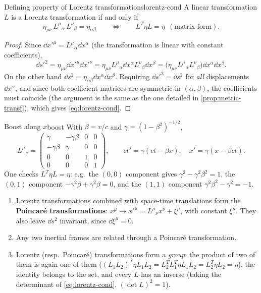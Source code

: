 \begin{proposition}{Defining property of Lorentz transformations}{lorentz-cond}
A linear transformation $L$ is a Lorentz transformation if and only if
\begin{equation}
  \eta_{\mu\nu}\,L^\mu{}_\alpha\,L^\nu{}_\beta=\eta_{\alpha\beta}
  \qquad\Longleftrightarrow\qquad L^{T}\eta L=\eta \ \ (\text{matrix form}).
  \label{eq:lorentz-cond}
\end{equation}
\end{proposition}
\begin{proof}
Since $\dd x'^\mu=L^\mu{}_\alpha\dd x^\alpha$ (the transformation is linear with constant coefficients),
\[
  \dd s'^2=\eta_{\mu\nu}\dd x'^\mu\dd x'^\nu=\eta_{\mu\nu}L^\mu{}_\alpha\dd x^\alpha L^\nu{}_\beta\dd x^\beta
  =\big(\eta_{\mu\nu}L^\mu{}_\alpha L^\nu{}_\beta\big)\dd x^\alpha\dd x^\beta .
\]
On the other hand $\dd s^2=\eta_{\alpha\beta}\dd x^\alpha\dd x^\beta$. Requiring $\dd s'^2=\dd s^2$ for \emph{all} displacements $\dd x^\alpha$, and since both coefficient matrices are symmetric in $(\alpha,\beta)$, the coefficients must coincide (the argument is the same as the one detailed in \cref{prop:metric-transf}), which gives \eqref{eq:lorentz-cond}.
\end{proof}

\begin{example}{Boost along $x$}{boost}
With $\beta=v/c$ and $\gamma=(1-\beta^2)^{-1/2}$,
\[
L^\mu{}_\nu=\begin{pmatrix}\gamma&-\gamma\beta&0&0\\-\gamma\beta&\gamma&0&0\\0&0&1&0\\0&0&0&1\end{pmatrix},
\qquad ct'=\gamma(ct-\beta x),\quad x'=\gamma(x-\beta ct).
\]
One checks $L^T\eta L=\eta$: e.g.\ the $(0,0)$ component gives $\gamma^2-\gamma^2\beta^2=1$, the $(0,1)$ component $-\gamma^2\beta+\gamma^2\beta=0$, and the $(1,1)$ component $\gamma^2\beta^2-\gamma^2=-1$.
\end{example}

\begin{remarkbox}[Remarks]
\begin{enumerate}[nosep]
  \item Lorentz transformations combined with space-time translations form the \textbf{Poincaré transformations}:
  $x^\mu\to x'^\mu=L^\mu{}_\nu x^\nu+\xi^\mu$, with constant $\xi^\mu$. They also leave $\dd s^2$ invariant, since $\dd\xi^\mu=0$.
  \item Any two inertial frames are related through a Poincaré transformation.
  \item Lorentz (resp.\ Poincaré) transformations form a \emph{group}: the product of two of them is again one of them ($(L_1L_2)^T\eta L_1L_2=L_2^TL_1^T\eta L_1L_2=L_2^T\eta L_2=\eta$), the identity belongs to the set, and every $L$ has an inverse (taking the determinant of \eqref{eq:lorentz-cond}, $(\det L)^2=1$).
\end{enumerate}
\end{remarkbox}

